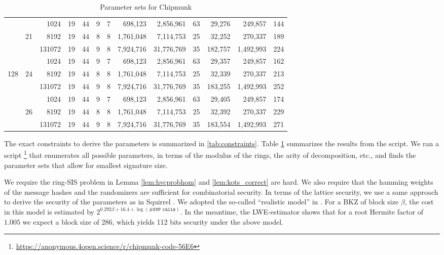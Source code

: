 \begin{table}
\begin{tabular}{|c|c|r||c|c||c|c|r|r||c||r|r||c|}
    &       &   1024 &         19 &        44 &          9 &       7 &        698,123 &  2,856,961 &    63 &       29,276 &   249,857 & 144 \\\cline{3-13}
    &    21 &   8192 &         19 &        44 &          8 &       8 &      1,761,048 &  7,114,753 &    25 &       32,252 &   270,337 & 189 \\\cline{3-13}
    &       & 131072 &         19 &        44 &          9 &       8 &      7,924,716 & 31,776,769 &    35 &      182,757 & 1,492,993 & 224 \\\cline{2-13}

    &       &   1024 &         19 &        44 &          9 &       7 &        698,123 &  2,856,961 &    63 &       29,357 &   249,857 & 162 \\\cline{3-13}
128 &    24 &   8192 &         19 &        44 &          8 &       8 &      1,761,048 &  7,114,753 &    25 &       32,339 &   270,337 & 213 \\\cline{3-13}
    &       & 131072 &         19 &        44 &          9 &       8 &      7,924,716 & 31,776,769 &    35 &      183,255 & 1,492,993 & 252 \\\cline{2-13}

    &       &   1024 &         19 &        44 &          9 &       7 &        698,123 &  2,856,961 &    63 &       29,405 &   249,857 & 174 \\\cline{3-13}
    &    26 &   8192 &         19 &        44 &          8 &       8 &      1,761,048 &  7,114,753 &    25 &       32,392 &   270,337 & 229 \\\cline{3-13}
    &       & 131072 &         19 &        44 &          9 &       8 &      7,924,716 & 31,776,769 &    35 &      183,554 & 1,492,993 & 271 \\\hline
  \end{tabular}\label{tab:param}
  \caption{Parameter sets for Chipmunk}
\end{table}

The exact constraints to derive the parameters is summarized in \autoref{tab:constraints}.
Table \ref{tab:param} summarizes the results from the script. 
We ran a script \footnote{\label{fn:github}\url{https://anonymous.4open.science/r/chipmunk-code-56E6}}
that enumerates all possible 
parameters, in terms of the modulus of the rings, the arity of decomposition, etc., and finds the parameter sets that
allow for smallest signature size.

We require the ring-SIS problem in Lemma \ref{lem:hvcprobhom} and \ref{lem:kots_correct} are hard. 
We also require that the hamming weights of the message hashes and the randomizers are sufficient for combinatorial security.
In terms of the lattice security, we use a same approach to derive the security of the parameters as in Squirrel \cite{CCS:FleSimZha22}.
We adopted the so-called ``realistic model'' in \cite{DBLP:conf/uss/AlkimDPS16}.
For a BKZ of block size $\beta$, the cost in this model is estimated by
$2^{0.292\beta+16.4+\log(\#\texttt{SVP calls})}$. 
In the meantime, the LWE-estimator \cite{DBLP:journals/jmc/AlbrechtPS15}
shows that for a root Hermite factor of $1.005$ we expect a block size of 286, which yields 112 bits security under the above model. 

